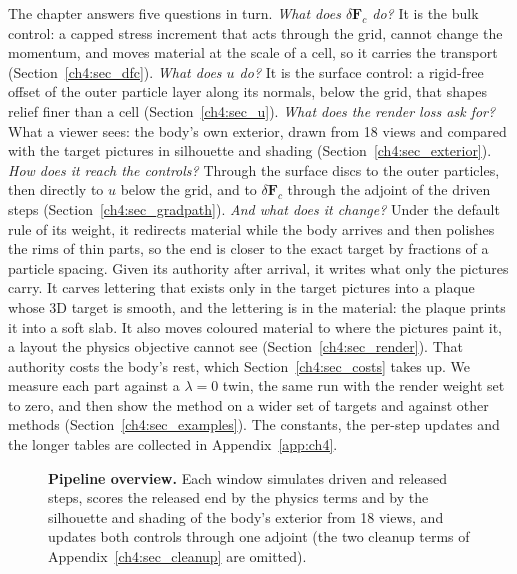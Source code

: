 The chapter answers five questions in turn. \emph{What does $\delta\mathbf{F}_c$ do?} It is the bulk control: a capped
stress increment that acts through the grid, cannot change the momentum, and moves material at the scale of a cell, so
it carries the transport (Section~\ref{ch4:sec_dfc}). \emph{What does $u$ do?} It is the surface control: a rigid-free
offset of the outer particle layer along its normals, below the grid, that shapes relief finer than a cell
(Section~\ref{ch4:sec_u}). \emph{What does the render loss ask for?} What a viewer sees: the body's own exterior, drawn
from 18 views and compared with the target pictures in silhouette and shading (Section~\ref{ch4:sec_exterior}).
\emph{How does it reach the controls?} Through the surface discs to the outer particles, then directly to $u$ below the
grid, and to $\delta\mathbf{F}_c$ through the adjoint of the driven steps (Section~\ref{ch4:sec_gradpath}). \emph{And what
does it change?} Under the default rule of its weight, it redirects material while the body arrives and then polishes the
rims of thin parts, so the end is closer to the exact target by fractions of a particle spacing. Given its authority after
arrival, it writes what only the pictures carry. It carves lettering that exists only in the target pictures into a plaque
whose 3D target is smooth, and the lettering is in the material: the plaque prints it into a soft slab. It also moves
coloured material to where the pictures paint it, a layout the physics objective cannot see (Section~\ref{ch4:sec_render}).
That authority costs the body's rest, which Section~\ref{ch4:sec_costs} takes up. We measure each part against a
$\lambda=0$ twin, the same run with the render weight set to zero, and then show the method on a wider set of targets and
against other methods (Section~\ref{ch4:sec_examples}). The constants, the per-step updates and the longer tables are
collected in Appendix~\ref{app:ch4}.

\begin{figure}[t]
    \centering
    \resizebox{\textwidth}{!}{}
    \caption[{Pipeline overview}]{\textbf{Pipeline overview.} Each window simulates driven and released steps, scores the released end by the
    physics terms and by the silhouette and shading of the body's exterior from 18 views, and updates both controls
    through one adjoint (the two cleanup terms of Appendix~\ref{ch4:sec_cleanup} are omitted).}
    \label{fig:overview}
\end{figure}

